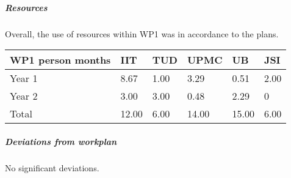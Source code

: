 

\subparagraph{Resources}
Overall, the use of resources within WP1 was in accordance to the plans. 

\begin{center}
  \begin{tabular}{|C{1.5cm}|C{1.5cm}|C{1.5cm}|C{2cm}|C{2cm}|C{2cm}|}
    \hline \footnotesize \textbf{WP1 person months}& \footnotesize
    \textbf{IIT}&\footnotesize \textbf{TUD}&\footnotesize \textbf{UPMC}&
    \footnotesize \textbf{UB} &\footnotesize \textbf{JSI}\\
    \hline \footnotesize Year 1 & 8.67 &1.00 & 3.29 & 0.51 & 2.00 \\
    \hline \footnotesize Year 2 & 3.00 & 3.00 & 0.48 & 2.29 & 0 \\
    \hline \footnotesize Total & 12.00 & 6.00 & 14.00 & 15.00 & 6.00 \\
    \hline
  \end{tabular}
\end{center}

\subparagraph{Deviations from workplan} 
No significant deviations. 
